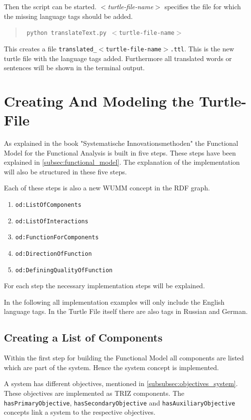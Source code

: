 \documentclass[11pt,a4paper]{article}
\begin{document}
Then the script can be started.  \emph{$<$turtle-file-name$>$} specifies the
file for which the missing language tags should be added.
\begin{quote}\tt
    python translateText.py $<$turtle-file-name$>$
\end{quote}

This creates a file \texttt{translated\_$<$turtle-file-name$>$.ttl}.  This is
the new turtle file with the language tags added.  Furthermore all translated
words or sentences will be shown in the terminal output.

\section{Creating And Modeling the Turtle-File}
\label{sec:turtle_file}

As explained in the book "Systematische Innovationsmethoden" the Functional
Model for the Functional Analysis is built in five steps.  These steps have
been explained in \ref{subsec:functional_model}.  The explanation of the
implementation will also be structured in these five steps.

Each of these steps is also a new WUMM concept in the RDF graph. 
\begin{enumerate}
\item \texttt{od:ListOfComponents}
\item \texttt{od:ListOfInteractions}
\item \texttt{od:FunctionForComponents}
\item \texttt{od:DirectionOfFunction}
\item \texttt{od:DefiningQualityOfFunction}
\end{enumerate}

For each step the necessary implementation steps will be explained.

In the following all implementation examples will only include the English
language tags.  In the Turtle File itself there are also tags in Russian and
German.

\subsection{Creating a List of Components}

Within the first step for building the Functional Model all components are
listed which are part of the system.  Hence the system concept is implemented.

A system has different objectives, mentioned in
\ref{subsubsec:objectives_system}.  These objectives are implemented as TRIZ
components.  The \texttt{hasPrimaryObjective}, \texttt{hasSecondaryObjective}
and \texttt{hasAuxiliaryObjective} concepts link a system to the respective 
objectives.
\end{document}
